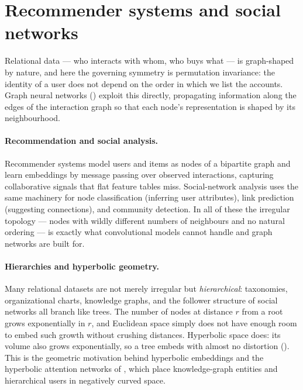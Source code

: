 \section{Recommender systems and social networks}
\label{sec:apps:graphs}

Relational data --- who interacts with whom, who buys what --- is graph-shaped
by nature, and here the governing symmetry is permutation invariance: the
identity of a user does not depend on the order in which we list the accounts.
Graph neural networks () exploit this directly, propagating
information along the edges of the interaction graph so that each node's
representation is shaped by its neighbourhood.

\paragraph{Recommendation and social analysis.}
Recommender systems model users and items as nodes of a bipartite graph and
learn embeddings by message passing over observed interactions, capturing
collaborative signals that flat feature tables miss. Social-network analysis
uses the same machinery for node classification (inferring user attributes),
link prediction (suggesting connections), and community detection. In all of
these the irregular topology --- nodes with wildly different numbers of
neighbours and no natural ordering --- is exactly what convolutional models
cannot handle and graph networks are built for.

\paragraph{Hierarchies and hyperbolic geometry.}
Many relational datasets are not merely irregular but \emph{hierarchical}:
taxonomies, organizational charts, knowledge graphs, and the follower structure
of social networks all branch like trees. The number of nodes at distance $r$
from a root grows exponentially in $r$, and Euclidean space simply does not have
enough room to embed such growth without crushing distances. Hyperbolic space
does: its volume also grows exponentially, so a tree embeds with almost no
distortion (). This is the geometric motivation behind
hyperbolic embeddings and the hyperbolic attention networks of
, which place knowledge-graph entities and hierarchical
users in negatively curved space.

